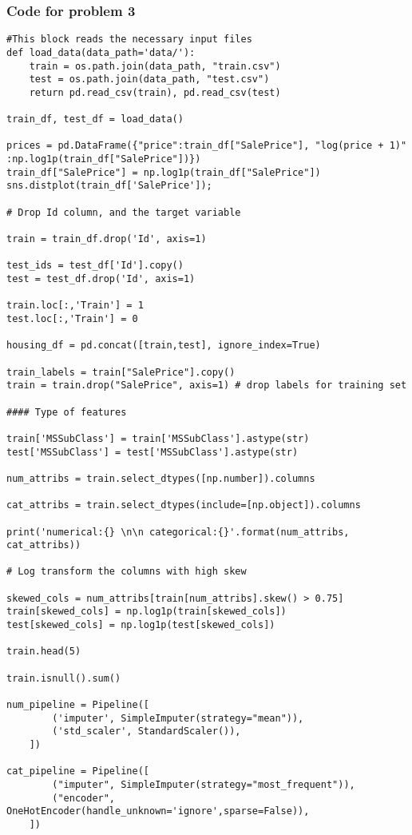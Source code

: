 \documentclass[12pt]{article}%
\begin{document}
\subsubsection*{Code for problem 3}
\begin{lstlisting}
#This block reads the necessary input files
def load_data(data_path='data/'):
    train = os.path.join(data_path, "train.csv")
    test = os.path.join(data_path, "test.csv")
    return pd.read_csv(train), pd.read_csv(test)

train_df, test_df = load_data()

prices = pd.DataFrame({"price":train_df["SalePrice"], "log(price + 1)"
:np.log1p(train_df["SalePrice"])})
train_df["SalePrice"] = np.log1p(train_df["SalePrice"])
sns.distplot(train_df['SalePrice']);

# Drop Id column, and the target variable

train = train_df.drop('Id', axis=1)

test_ids = test_df['Id'].copy()
test = test_df.drop('Id', axis=1)

train.loc[:,'Train'] = 1
test.loc[:,'Train'] = 0

housing_df = pd.concat([train,test], ignore_index=True)

train_labels = train["SalePrice"].copy()
train = train.drop("SalePrice", axis=1) # drop labels for training set

#### Type of features

train['MSSubClass'] = train['MSSubClass'].astype(str)
test['MSSubClass'] = test['MSSubClass'].astype(str)

num_attribs = train.select_dtypes([np.number]).columns

cat_attribs = train.select_dtypes(include=[np.object]).columns

print('numerical:{} \n\n categorical:{}'.format(num_attribs, cat_attribs))

# Log transform the columns with high skew

skewed_cols = num_attribs[train[num_attribs].skew() > 0.75]
train[skewed_cols] = np.log1p(train[skewed_cols])
test[skewed_cols] = np.log1p(test[skewed_cols])

train.head(5)

train.isnull().sum()

num_pipeline = Pipeline([
        ('imputer', SimpleImputer(strategy="mean")),
        ('std_scaler', StandardScaler()),
    ])

cat_pipeline = Pipeline([
        ("imputer", SimpleImputer(strategy="most_frequent")),
        ("encoder", OneHotEncoder(handle_unknown='ignore',sparse=False)),
    ])



\end{lstlisting}
\end{document}
